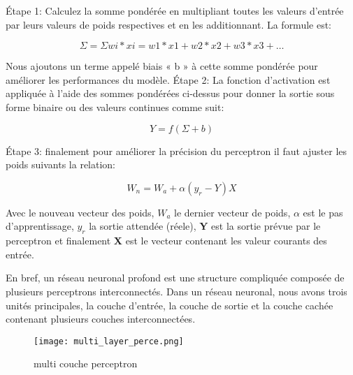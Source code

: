             Étape 1: Calculez la somme pondérée en multipliant toutes les valeurs d'entrée par leurs valeurs de poids respectives et en les additionnant. La formule est:

            \begin{equation}\label{eq:per_sum}
                \Sigma = \Sigma wi*xi = w1*x1 + w2*x2 + w3*x3 + \dots
            \end{equation}


            Nous ajoutons un terme appelé biais « b » à cette somme pondérée pour améliorer les performances du modèle. 
            Étape 2: La fonction d'activation est appliquée à l'aide des sommes pondérées ci-dessus pour donner la sortie sous forme binaire ou des valeurs continues comme suit:


            \begin{equation}\label{eq:per_func}
                Y = f(\Sigma + b)
            \end{equation}

            Étape 3: finalement pour améliorer la précision du perceptron il faut ajuster les poids suivants la relation:

            \begin{equation}\label{eq:per_weights}
                W_n = W_a + \alpha (y_r - Y) X
            \end{equation}
            

            Avec  le nouveau vecteur des poids, \textbf{\(W_a\)} le dernier vecteur de poids, \textbf{\(\alpha\)} est le pas d'apprentissage, \textbf{\(y_r\)} la sortie attendée (réele), \textbf{Y} est la sortie prévue par le perceptron et finalement \textbf{X} est le vecteur contenant les valeur courants des entrée.

        En bref, un réseau neuronal profond est une structure compliquée composée de plusieurs perceptrons interconnectés. Dans un réseau neuronal, nous avons trois unités principales, la couche d'entrée, la couche de sortie et la couche cachée contenant plusieurs couches interconnectées.
        
        \begin{figure}[H] 
            \centering
            \texttt{[image: multi\_layer\_perce.png]}
            \caption{multi couche perceptron}
            \label{fig:m_l_p}
        \end{figure}

